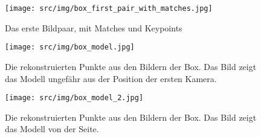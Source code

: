 \begin{figure}
    \texttt{[image: src/img/box\_first\_pair\_with\_matches.jpg]}
    \caption{Das erste Bildpaar, mit Matches und Keypoints}
    \label{fig:box-first-pair-with-matches}
\end{figure}

\begin{figure}
    \texttt{[image: src/img/box\_model.jpg]}
    \caption{Die rekonstruierten Punkte aus den Bildern der Box. Das Bild zeigt das Modell ungefähr aus der Position der ersten Kamera.}
    \label{fig:box-model}
\end{figure}

\begin{figure}
    \texttt{[image: src/img/box\_model\_2.jpg]}
    \caption{Die rekonstruierten Punkte aus den Bildern der Box. Das Bild zeigt das Modell von der Seite.}
    \label{fig:box-model-2}
\end{figure}